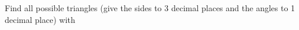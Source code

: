 \question Find all possible triangles 
(give the sides to 3 decimal places and the angles to 1 decimal place) with
\begin{multicols}{3}
\end{multicols}

